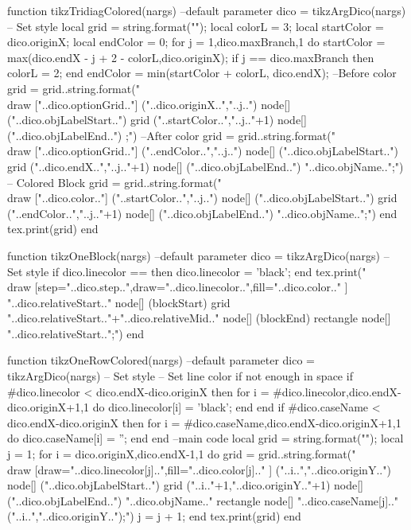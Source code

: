 \begin{luacode*}
{{{  function tikzTridiagColored(nargs)
  --default parameter
  dico = tikzArgDico(nargs)
  -- Set style
  local grid = string.format("");
  local colorL = 3;
  local startColor = dico.originX;
  local endColor = 0;
  for j = 1,dico.maxBranch,1 do
    startColor = max(dico.endX - j + 2 - colorL,dico.originX);
    if j == dico.maxBranch then
      colorL = 2;
    end
    endColor = min(startColor + colorL, dico.endX);
    --Before color
    grid = grid..string.format("\\draw ["..dico.optionGrid.."] ("..dico.originX..","..j..") node[] ("..dico.objLabelStart..") {} grid ("..startColor..","..j.."+1) node[] ("..dico.objLabelEnd..") {};")
    --After color
    grid = grid..string.format("\\draw ["..dico.optionGrid.."] ("..endColor..","..j..") node[] ("..dico.objLabelStart..") {} grid ("..dico.endX..","..j.."+1) node[] ("..dico.objLabelEnd..") {"..dico.objName.."};")
    -- Colored Block
    grid = grid..string.format("\\draw ["..dico.color.."] ("..startColor..","..j..") node[] ("..dico.objLabelStart..") {} grid ("..endColor..","..j.."+1) node[] ("..dico.objLabelEnd..") {"..dico.objName.."};")
  end
	tex.print(grid)
  end

  function tikzOneBlock(nargs)
	--default parameter
	dico = tikzArgDico(nargs)
	-- Set style
	if dico.linecolor == {} then
		dico.linecolor = 'black';
  	end
  	tex.print("\\draw [step="..dico.step..",draw="..dico.linecolor..",fill="..dico.color.." ] "..dico.relativeStart.." node[] (blockStart) {} grid "..dico.relativeStart.."+"..dico.relativeMid.." node[] (blockEnd) {} rectangle node[] {} "..dico.relativeStart..";")
  end

  function tikzOneRowColored(nargs)
  --default parameter
  dico = tikzArgDico(nargs)
  -- Set style
  -- Set line color if not enough in space
  if #dico.linecolor < dico.endX-dico.originX then
  	for i = #dico.linecolor,dico.endX-dico.originX+1,1 do
		dico.linecolor[i] = 'black';
	end
  end
  if #dico.caseName < dico.endX-dico.originX then
  	for i = #dico.caseName,dico.endX-dico.originX+1,1 do
		dico.caseName[i] = '';
	end
  end
  --main code
  local grid = string.format("");
  local j = 1;
  for i = dico.originX,dico.endX-1,1 do
    grid = grid..string.format("\\draw [draw="..dico.linecolor[j]..",fill="..dico.color[j].." ] ("..i..","..dico.originY..") node[] ("..dico.objLabelStart..") {} grid ("..i.."+1,"..dico.originY.."+1) node[] ("..dico.objLabelEnd..") {"..dico.objName.."} rectangle node[] {"..dico.caseName[j].."} ("..i..","..dico.originY..");")
    j = j + 1;
  end
	tex.print(grid)
  end

}}}
\end{luacode*}
